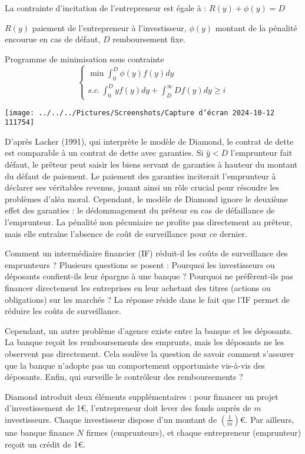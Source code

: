\documentclass[a4paper, 12pt]{report}
\begin{document}
La contrainte d’incitation de l’entrepreneur est égale à : $R(y)+\phi(y)=D$

$R(y)$ paiement de l’entrepreneur à l’investisseur, $\phi(y)$ montant de la pénalité encourue en cas de défaut, $D$ remboursement fixe.

Programme de minimisation sous contrainte
$$
\begin{cases}\min \int_{0}^{D} \phi(y)f(y)dy \\s.c. \, \int_{0}^{D} yf(y)dy+\int_{D}^{\infty}Df(y)dy\ge i\end{cases}
$$
\begin{center}
	\texttt{[image: ../../../Pictures/Screenshots/Capture d'écran 2024-10-12 111754]}
\end{center}

D’après Lacker (1991), qui interprète le modèle de Diamond, le contrat de dette est comparable à un contrat de dette avec garanties. Si $\widehat{y}<D$ l'emprunteur fait défaut, le prêteur peut saisir les biens servant de garanties à hauteur du montant du défaut de paiement. Le paiement des garanties inciterait l’emprunteur à déclarer ses véritables revenus, jouant ainsi un rôle crucial pour résoudre les problèmes d’aléa moral. Cependant, le modèle de Diamond ignore le deuxième effet des garanties : le dédommagement du prêteur en cas de défaillance de l'emprunteur. La pénalité non pécuniaire ne profite pas directement au prêteur, mais elle entraîne l'absence de coût de surveillance pour ce dernier.

Comment un intermédiaire financier (IF) réduit-il les coûts de surveillance des emprunteurs ? Plusieurs questions se posent : Pourquoi les investisseurs ou déposants confient-ils leur épargne à une banque ? Pourquoi ne préfèrent-ils pas financer directement les entreprises en leur achetant des titres (actions ou obligations) sur les marchés ? La réponse réside dans le fait que l'IF permet de réduire les coûts de surveillance. 

Cependant, un autre problème d’agence existe entre la banque et les déposants. La banque reçoit les remboursements des emprunts, mais les déposants ne les observent pas directement. Cela soulève la question de savoir comment s’assurer que la banque n’adopte pas un comportement opportuniste vis-à-vis des déposants. Enfin, qui surveille le contrôleur des remboursements ?

Diamond introduit deux éléments supplémentaires : pour financer un projet d'investissement de 1\euro, l'entrepreneur doit lever des fonds auprès de $m$ investisseurs. Chaque investisseur dispose d'un montant de $\left( \frac{1}{m}\right)$\euro. Par ailleurs, une banque finance $N$ firmes (emprunteurs), et chaque entrepreneur (emprunteur) reçoit un crédit de 1\euro.
\end{document}
